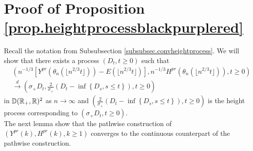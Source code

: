 \section{Proof of Proposition \ref{prop.heightprocessblackpurplered}}\label{appendix.heightprocessblackpurplered}
Recall the notation from Subsubsection \ref{subsubsec.convheightprocess}. We will show that there exists a process $(D_t,t\geq 0)$ such that 
\begin{align*}
    &\left(n^{-1/3}\left[Y^{pr}\left(\theta_n\left(\lfloor n^{2/3}t\rfloor \right)\right)-E\left(\lfloor n^{2/3}t\rfloor \right)\right], n^{-1/3}H^{pr}\left(\theta_n\left(\lfloor n^{2/3}t\rfloor \right)\right),t\geq 0\right)\\
    &\overset{d}{\to}\left(\sigma_+D_t,\frac{2}{\sigma_+}\left(D_t-\inf\left\{D_s,s\leq t\right\}\right),t\geq 0\right)
\end{align*}
in ${\mathbb D}({\mathbb R}_+,{\mathbb R})^2$ as $n\to \infty$ and $\left(\frac{2}{\sigma_+}\left(D_t-\inf\left\{D_s,s\leq t\right\}\right),t\geq 0\right)$ is the height process corresponding to $(\sigma_+D_t,t\geq 0)$.
\\The next lemma show that the pathwise construction of $(Y^{pr}(k),H^{pr}(k),k\geq 1)$ converges to the continuous counterpart of the pathwise construction.

